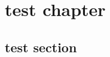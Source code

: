 \documentclass[pdftex,10pt,a4paper]{report}
\begin{document}


\newpage


\newpage
{}

\tableofcontents 

\newpage
{}

\begingroup
\renewcommand{\cleardoublepage}{}
\renewcommand{\clearpage}{}
	\chapter{test chapter}\label{chap:ack}
		\section{test section}
		
\endgroup
	
\end{document}
